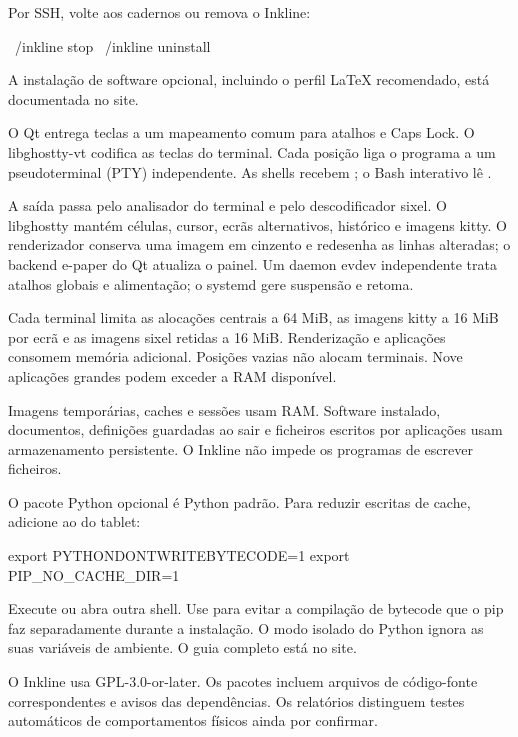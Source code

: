 Por SSH, volte aos cadernos ou remova o Inkline:
\begin{shell}
~/inkline stop
~/inkline uninstall
\end{shell}
A instalação de software opcional, incluindo o perfil LaTeX recomendado,
está documentada no site.

O Qt entrega teclas a um mapeamento comum para atalhos e Caps Lock.
O libghostty-vt codifica as teclas do terminal. Cada posição liga o programa
a um pseudoterminal (PTY) independente. As shells recebem
; o Bash interativo lê .

A saída passa pelo analisador do terminal e pelo descodificador sixel.
O libghostty mantém células, cursor, ecrãs alternativos, histórico e imagens
kitty. O renderizador conserva uma imagem em cinzento e redesenha as linhas
alteradas; o backend e-paper do Qt atualiza o painel. Um daemon evdev independente
trata atalhos globais e alimentação; o systemd gere suspensão e retoma.

Cada terminal limita as alocações centrais a 64 MiB, as imagens kitty a
16 MiB por ecrã e as imagens sixel retidas a 16 MiB. Renderização e aplicações
consomem memória adicional. Posições vazias não alocam terminais.
Nove aplicações grandes podem exceder a RAM disponível.

Imagens temporárias, caches e sessões usam RAM. Software instalado, documentos,
definições guardadas ao sair e ficheiros escritos por aplicações usam armazenamento
persistente. O Inkline não impede os programas de escrever ficheiros.

O pacote Python opcional é Python padrão. Para reduzir escritas de cache,
adicione ao  do tablet:
\begin{shell}
export PYTHONDONTWRITEBYTECODE=1
export PIP_NO_CACHE_DIR=1
\end{shell}
Execute  ou abra outra shell. Use
 para evitar a compilação
de bytecode que o pip faz separadamente durante a instalação. O modo isolado
do Python ignora as suas variáveis de ambiente. O guia completo está no site.

O Inkline usa GPL-3.0-or-later. Os pacotes incluem arquivos de código-fonte
correspondentes e avisos das dependências. Os relatórios distinguem testes
automáticos de comportamentos físicos ainda por confirmar.
